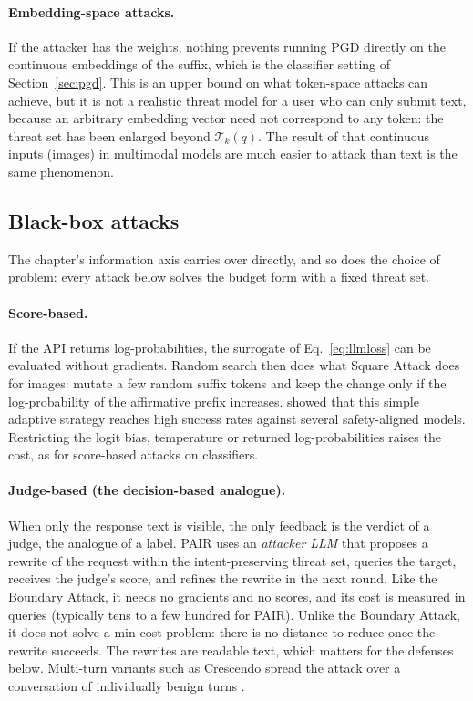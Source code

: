 \documentclass[10pt,a4paper]{extarticle}
\theoremstyle{definition}
\newcommand{\T}{\mathcal{T}}
\begin{document}
\paragraph{Embedding-space attacks.} If the attacker has the weights, nothing prevents running PGD directly on the continuous embeddings of the suffix, which is the classifier setting of Section~\ref{sec:pgd}. This is an upper bound on what token-space attacks can achieve, but it is not a realistic threat model for a user who can only submit text, because an arbitrary embedding vector need not correspond to any token: the threat set has been enlarged beyond \(\T_k(q)\). The result of \citet{carlini2023aligned} that continuous inputs (images) in multimodal models are much easier to attack than text is the same phenomenon.

\subsection{Black-box attacks}

The chapter's information axis carries over directly, and so does the choice of problem: every attack below solves the budget form with a fixed threat set.

\paragraph{Score-based.} If the API returns log-probabilities, the surrogate of Eq.~\eqref{eq:llmloss} can be evaluated without gradients. Random search then does what Square Attack does for images: mutate a few random suffix tokens and keep the change only if the log-probability of the affirmative prefix increases. \citet{andriushchenko2024simple} showed that this simple adaptive strategy reaches high success rates against several safety-aligned models. Restricting the logit bias, temperature or returned log-probabilities raises the cost, as for score-based attacks on classifiers.

\paragraph{Judge-based (the decision-based analogue).} When only the response text is visible, the only feedback is the verdict of a judge, the analogue of a label. PAIR \citep{chao2023jailbreaking} uses an \emph{attacker LLM} that proposes a rewrite of the request within the intent-preserving threat set, queries the target, receives the judge's score, and refines the rewrite in the next round. Like the Boundary Attack, it needs no gradients and no scores, and its cost is measured in queries (typically tens to a few hundred for PAIR). Unlike the Boundary Attack, it does not solve a min-cost problem: there is no distance to reduce once the rewrite succeeds. The rewrites are readable text, which matters for the defenses below. Multi-turn variants such as Crescendo spread the attack over a conversation of individually benign turns \citep{nist2025ai1002}.
\end{document}
